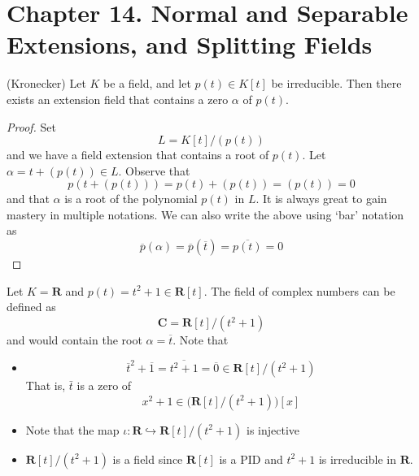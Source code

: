 \section{Chapter 14. Normal and Separable Extensions, and Splitting Fields}
\begin{thm}
(Kronecker) Let $K$ be a field, and let $p(t)\in K[t]$ be irreducible. Then there exists an extension field that contains a zero $\alpha $ of $p(t)$. 
\end{thm}
\vspace{2ex}
\begin{proof}
Set
\[L=K[t]/(p(t))\]
and we have a field extension that contains a root of $p(t)$. Let $\alpha =t+(p(t))\in L$. Observe that 
\[p(t+(p(t)))=p(t)+(p(t))=(p(t))=0\]
and that $\alpha $ is a root of the polynomial $p(t)$ in $L$. It is always great to gain mastery in multiple notations. We can also write the above using `bar' notation as
\[\overline{p}(\alpha )=\overline{p}(\overline{t})=\overline{p(t)}=0\]

\end{proof}
\vspace{2ex}
\begin{ex}
Let $K={\bm R}$ and $p(t)=t^2+1\in {\bm R}[t]$. The field of complex numbers can be defined as
\[{\bm C}={\bm R}[t]/(t^2+1)\]
and would contain the root $\alpha =\overline{t}$. Note that
\begin{itemize}
\item[(i)] \[\overline{t}^2+\overline{1}=\overline{t^2+1}=\overline{0}\in {\bm R}[t]/(t^2+1)\]
That is, $\bar{t}$ is a zero of
\[x^2+1\in \Big({\bm R}[t]/(t^2+1)\Big)[x]\]
\item[(ii)] Note that the map $\iota:{\bm R}\hookrightarrow {\bm R}[t]/(t^2+1)$ is injective
\item[(iii)] ${\bm R}[t]/(t^2+1)$ is a field since ${\bm R}[t]$ is a PID and $t^2+1$ is irreducible in ${\bm R}$. 
\end{itemize}
\end{ex}
\vspace{2ex}

